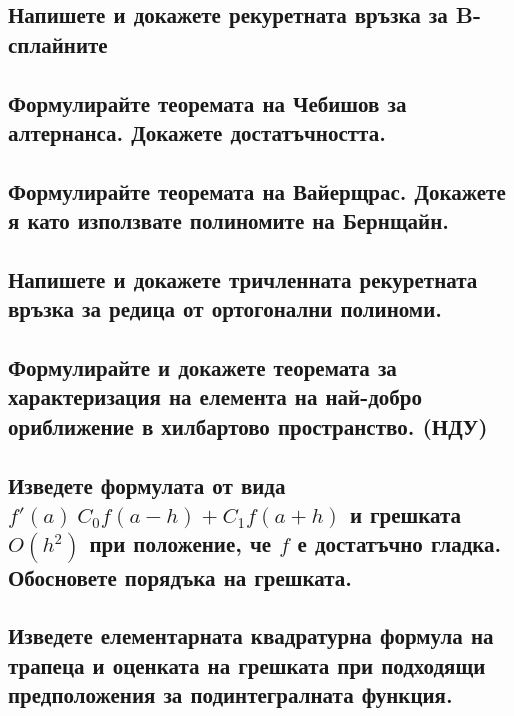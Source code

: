 \documentclass[12pt]{article}
\numberwithin{equation}{subsection}
\numberwithin{theorem}{subsection}
\numberwithin{definition}{subsection}
\numberwithin{corollary}{subsection}
\begin{document}
\subsection{Напишете и докажете рекуретната връзка за B-сплайните}

\subsection{Формулирайте теоремата на Чебишов за алтернанса. Докажете достатъчността.}

\subsection{Формулирайте теоремата на Вайерщрас. Докажете я като използвате полиномите на Бернщайн.}

\subsection{Напишете и докажете тричленната рекуретната връзка за редица от ортогонални полиноми.}

\subsection{Формулирайте и докажете теоремата за характеризация на елемента на най-добро ориближение в хилбартово пространство. (НДУ)}

\subsection{Изведете формулата от вида $f'(a) ~ C_0 f(a - h) + C_1 f(a + h)$ и грешката $O(h^2)$ при положение, че $f$ е достатъчно гладка.
        Обосновете порядъка на грешката.}

\subsection{Изведете елементарната квадратурна формула на трапеца и оценката на грешката при подходящи предположения за подинтегралната функция.}
\end{document}
